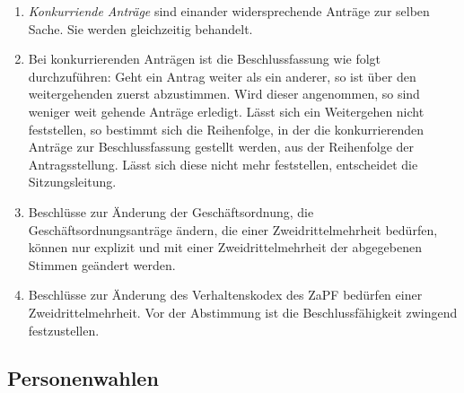 \documentclass[
  ngerman,
  a4paper,
  oneside]{scrartcl}
\begin{document}
\begin{enumerate}
  oder sie von den hauptantragstellenden Personen übernommen werden,
  wird der Hauptantrag in der geänderten Fassung zur Beschlussfassung
  gestellt. Die antragstellende Person hat bis zur endgültigen
  Beschlussfassung das Recht, auch eine geänderte Fassung ihres Antrages
  zurückzuziehen.
\item
  \emph{Konkurriende Anträge} sind einander widersprechende Anträge zur
  selben Sache. Sie werden gleichzeitig behandelt.
\item
  Bei konkurrierenden Anträgen ist die Beschlussfassung wie folgt
  durchzuführen: Geht ein Antrag weiter als ein anderer, so ist über den
  weitergehenden zuerst abzustimmen. Wird dieser angenommen, so sind
  weniger weit gehende Anträge erledigt. Lässt sich ein Weitergehen
  nicht feststellen, so bestimmt sich die Reihenfolge, in der die
  konkurrierenden Anträge zur Beschlussfassung gestellt werden, aus der
  Reihenfolge der Antragsstellung. Lässt sich diese nicht mehr
  feststellen, entscheidet die Sitzungsleitung.
\item
  Beschlüsse zur Änderung der Geschäftsordnung, die
  Geschäftsordnungsanträge ändern, die einer Zweidrittelmehrheit
  bedürfen, können nur explizit und mit einer Zweidrittelmehrheit der
  abgegebenen Stimmen geändert werden.
\item
  Beschlüsse zur Änderung des Verhaltenskodex des ZaPF bedürfen einer
  Zweidrittelmehrheit. Vor der Abstimmung ist die Beschlussfähigkeit
  zwingend festzustellen.
\end{enumerate}

\subsection{Personenwahlen}\label{personenwahlen}
\end{document}
